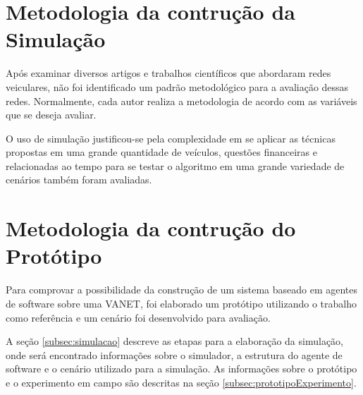 \section{Metodologia da contrução da Simulação}
\label{sec:metodologiaSimulacao}

Após examinar diversos artigos e trabalhos científicos que abordaram redes veiculares, não foi identificado um padrão metodológico para a avaliação dessas redes. Normalmente, cada autor realiza a metodologia de acordo com as variáveis que se deseja avaliar. 

O uso de simulação justificou-se pela complexidade em se aplicar as técnicas propostas em uma grande quantidade de veículos, questões financeiras e relacionadas ao tempo para se testar o algoritmo em uma grande variedade de cenários também foram avaliadas.




\section{Metodologia da contrução do Protótipo}
\label{sec:metodologiaPrototipo}
Para comprovar a possibilidade da construção de um sistema baseado em agentes de software sobre uma VANET, foi elaborado um protótipo utilizando o trabalho \cite{santanaMestrado:2014} como referência e um cenário foi desenvolvido para avaliação.

A seção \ref{subsec:simulacao} descreve as etapas para a elaboração da simulação, onde será encontrado informações sobre o simulador, a estrutura do agente de software e o cenário utilizado para a simulação. As informações sobre o protótipo e o experimento em campo são descritas na seção \ref{subsec:prototipoExperimento}.



